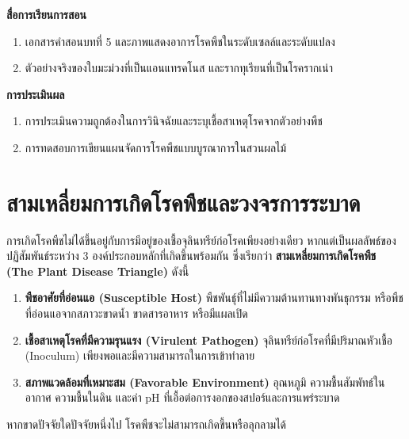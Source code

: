 \noindent\textbf{สื่อการเรียนการสอน}
\begin{enumerate}
    \item เอกสารคำสอนบทที่ 5 และภาพแสดงอาการโรคพืชในระดับเซลล์และระดับแปลง
    \item ตัวอย่างจริงของใบมะม่วงที่เป็นแอนแทรคโนส และรากทุเรียนที่เป็นโรครากเน่า
\end{enumerate}

\noindent\textbf{การประเมินผล}
\begin{enumerate}
    \item การประเมินความถูกต้องในการวินิจฉัยและระบุเชื้อสาเหตุโรคจากตัวอย่างพืช
    \item การทดสอบการเขียนแผนจัดการโรคพืชแบบบูรณาการในสวนผลไม้
\end{enumerate}

\newpage


\section{สามเหลี่ยมการเกิดโรคพืชและวงจรการระบาด}

การเกิดโรคพืชไม่ได้ขึ้นอยู่กับการมีอยู่ของเชื้อจุลินทรีย์ก่อโรคเพียงอย่างเดียว หากแต่เป็นผลลัพธ์ของปฏิสัมพันธ์ระหว่าง 3 องค์ประกอบหลักที่เกิดขึ้นพร้อมกัน ซึ่งเรียกว่า \textbf{สามเหลี่ยมการเกิดโรคพืช (The Plant Disease Triangle)} ดังนี้
\begin{enumerate}
    \item \textbf{พืชอาศัยที่อ่อนแอ (Susceptible Host)} พืชพันธุ์ที่ไม่มีความต้านทานทางพันธุกรรม หรือพืชที่อ่อนแอจากสภาวะขาดน้ำ ขาดสารอาหาร หรือมีแผลเปิด
    \item \textbf{เชื้อสาเหตุโรคที่มีความรุนแรง (Virulent Pathogen)} จุลินทรีย์ก่อโรคที่มีปริมาณหัวเชื้อ (Inoculum) เพียงพอและมีความสามารถในการเข้าทำลาย
    \item \textbf{สภาพแวดล้อมที่เหมาะสม (Favorable Environment)} อุณหภูมิ ความชื้นสัมพัทธ์ในอากาศ ความชื้นในดิน และค่า pH ที่เอื้อต่อการงอกของสปอร์และการแพร่ระบาด
\end{enumerate}
หากขาดปัจจัยใดปัจจัยหนึ่งไป โรคพืชจะไม่สามารถเกิดขึ้นหรือลุกลามได้

